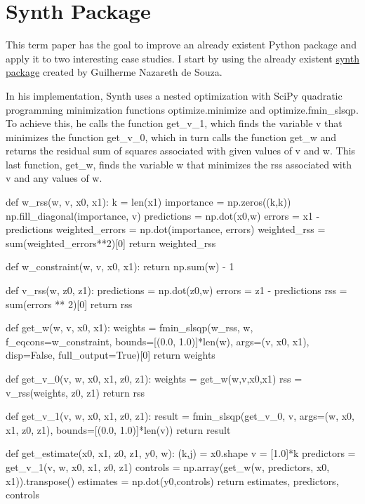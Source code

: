 \documentclass[11pt, a4paper, leqno]{article}
\begin{document}
\section{Synth Package} %
\label{synth}

This term paper has the goal to improve an already existent Python package and apply it to two interesting case studies. I start by using the already existent \href{https://github.com/gnazareths/synth}{synth package} created by Guilherme Nazareth de Souza. 

In his implementation, Synth uses a nested optimization with SciPy quadratic programming minimization functions optimize.minimize and optimize.fmin\_slsqp. To achieve this, he calls the function get\_v\_1, which finds the variable v that minimizes the function get\_v\_0, which in turn calls the function get\_w and returns the residual sum of squares associated with given values of v and w. This last function, get\_w, finds the variable w that minimizes the rss associated with v and any values of w.

\begin{python}
def w_rss(w, v, x0, x1):
    k = len(x1)
    importance = np.zeros((k,k))
    np.fill_diagonal(importance, v)
    predictions = np.dot(x0,w)
    errors = x1 - predictions
    weighted_errors = np.dot(importance, errors)
    weighted_rss = sum(weighted_errors**2)[0]
    return weighted_rss

def w_constraint(w, v, x0, x1):
    return np.sum(w) - 1

def v_rss(w, z0, z1):
    predictions = np.dot(z0,w)
    errors = z1 - predictions
    rss = sum(errors ** 2)[0]
    return rss

def get_w(w, v, x0, x1):
    weights = fmin_slsqp(w_rss, w, f_eqcons=w_constraint, 
             bounds=[(0.0, 1.0)]*len(w),
             args=(v, x0, x1), disp=False, full_output=True)[0]
    return weights

def get_v_0(v, w, x0, x1, z0, z1):
    weights = get_w(w,v,x0,x1)
    rss = v_rss(weights, z0, z1)
    return rss

def get_v_1(v, w, x0, x1, z0, z1):
    result = fmin_slsqp(get_v_0, v, args=(w, x0, x1, z0, z1), 
            bounds=[(0.0, 1.0)]*len(v))
    return result

def get_estimate(x0, x1, z0, z1, y0, w):
    (k,j) = x0.shape
    v = [1.0]*k
    predictors = get_v_1(v, w, x0, x1, z0, z1)
    controls = np.array(get_w(w, predictors, x0, x1)).transpose()
    estimates = np.dot(y0,controls)
    return estimates, predictors, controls
\end{python}
\end{document}
